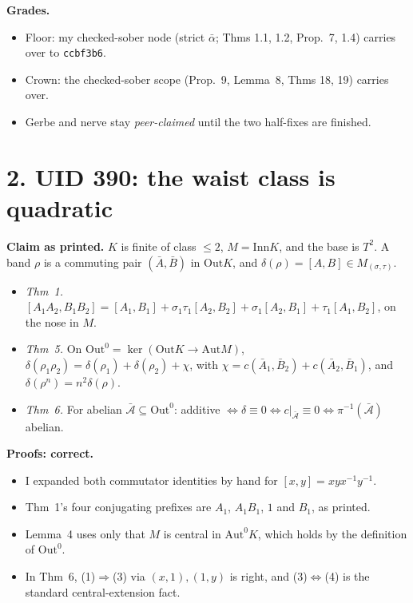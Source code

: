 \documentclass[10pt]{article}
\newcommand{\Inn}{\mathrm{Inn}}
\newcommand{\Out}{\mathrm{Out}}
\newcommand{\Aut}{\mathrm{Aut}}
\begin{document}
\textbf{Grades.}
\begin{itemize}
\item Floor: my checked-sober node (strict $\bar\alpha$; Thms 1.1, 1.2, Prop.~7, 1.4) carries over to \texttt{ccbf3b6}.
\item Crown: the checked-sober scope (Prop.~9, Lemma~8, Thms 18, 19) carries over.
\item Gerbe and nerve stay \emph{peer-claimed} until the two half-fixes are finished.
\end{itemize}

\section*{2. UID 390: the waist class is quadratic}
\textbf{Claim as printed.} $K$ is finite of class $\le2$, $M=\Inn K$, and the base is $T^2$. A band $\rho$ is a commuting pair $(\bar A,\bar B)$ in $\Out K$, and $\delta(\rho)=[A,B]\in M_{(\sigma,\tau)}$.
\begin{itemize}
\item \emph{Thm~1.} $[A_1A_2,B_1B_2]=[A_1,B_1]+\sigma_1\tau_1[A_2,B_2]+\sigma_1[A_2,B_1]+\tau_1[A_1,B_2]$, on the nose in $M$.
\item \emph{Thm~5.} On $\Out^0=\ker(\Out K\to\Aut M)$, $\delta(\rho_1\rho_2)=\delta(\rho_1)+\delta(\rho_2)+\chi$, with $\chi=c(\bar A_1,\bar B_2)+c(\bar A_2,\bar B_1)$, and $\delta(\rho^n)=n^2\delta(\rho)$.
\item \emph{Thm~6.} For abelian $\bar{\mathcal A}\subseteq\Out^0$: additive $\iff\delta\equiv0\iff c|_{\bar{\mathcal A}}\equiv0\iff\pi^{-1}(\bar{\mathcal A})$ abelian.
\end{itemize}

\textbf{Proofs: correct.}
\begin{itemize}
\item I expanded both commutator identities by hand for $[x,y]=xyx^{-1}y^{-1}$.
\item Thm~1's four conjugating prefixes are $A_1$, $A_1B_1$, $1$ and $B_1$, as printed.
\item Lemma~4 uses only that $M$ is central in $\Aut^0K$, which holds by the definition of $\Out^0$.
\item In Thm~6, (1)$\Rightarrow$(3) via $(x,1),(1,y)$ is right, and (3)$\Leftrightarrow$(4) is the standard central-extension fact.
\end{itemize}
\end{document}
